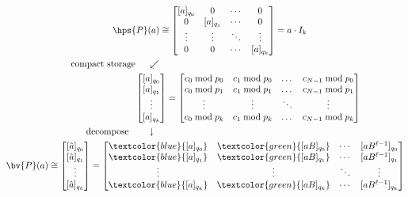 \begin{gather*}
\quad \hps{P}(a) \cong 
\begin{bmatrix} 
    [a]_{q_0} & 0 & \cdots & 0 \\ 
    0 & [a]_{q_1} & \cdots & 0 \\
    \vdots & \vdots & \ddots & \vdots \\
    0 & 0 & \cdots & [a]_{q_k} \\
\end{bmatrix}
= a\cdot I_k \\
\text{compact storage }\quad \swarrow\hspace{7cm} %
\\
\hspace{3.5cm}
\begin{bmatrix}
    [a]_{q_0}\\ 
    [a]_{q_1}\\
    \vdots \\
    [a]_{q_k} \\
\end{bmatrix} 
=
\begin{bmatrix}
    c_0 \bmod{p_0} & c_1 \bmod{p_0} & \dots & c_{N-1}\bmod{p_0} \\
    c_0 \bmod{p_1} & c_1 \bmod{p_1} & \dots & c_{N-1}\bmod{p_1} \\
    \vdots & \vdots & \ddots & \vdots \\
    c_0 \bmod{p_k} & c_1 \bmod{p_k} & \dots & c_{N-1}\bmod{p_k}
\end{bmatrix} \;\,
\\
\text{decompose}\quad\quad\downarrow\hspace{6.6cm}
\\
\bv{P}(a) \cong
\begin{bmatrix}
    [\hat{a}]_{q_0}\\ 
    [\hat{a}]_{q_1}\\
    \vdots \\
    [\hat{a}]_{q_k} \\
\end{bmatrix}
=
\begin{bmatrix} 
    \textcolor{blue}{[a]_{q_0}} & \textcolor{green}{[aB]_{q_0}} & \cdots & [aB^{\ell-1}]_{q_0} \\ 
    \textcolor{blue}{[a]_{q_1}} & \textcolor{green}{[aB]_{q_1}} & \cdots & [aB^{\ell-1}]_{q_1} \\
    \vdots & \vdots & \ddots & \vdots \\
    \textcolor{blue}{[a]_{q_k}} & \textcolor{green}{[aB]_{q_k}} & \cdots & [aB^{\ell-1}]_{q_k} \\

\end{bmatrix}
\end{gather*}
